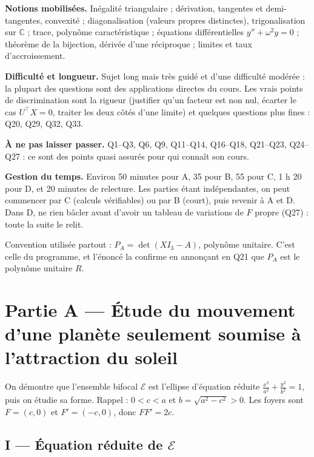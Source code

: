 \documentclass[11pt,a4paper]{article}
\begin{document}
\textbf{Notions mobilisées.} Inégalité triangulaire ; dérivation, tangentes et demi-tangentes, convexité ; diagonalisation (valeurs propres distinctes), trigonalisation sur \(\mathbb{C}\) ; trace, polynôme caractéristique ; équations différentielles \(y''+\omega^2y=0\) ; théorème de la bijection, dérivée d'une réciproque ; limites et taux d'accroissement.

\textbf{Difficulté et longueur.} Sujet long mais très guidé et d'une difficulté modérée : la plupart des questions sont des applications directes du cours. Les vrais points de discrimination sont la rigueur (justifier qu'un facteur est non nul, écarter le cas \(U^\top X=0\), traiter les deux côtés d'une limite) et quelques questions plus fines : Q20, Q29, Q32, Q33.

\textbf{À ne pas laisser passer.} Q1--Q3, Q6, Q9, Q11--Q14, Q16--Q18, Q21--Q23, Q24--Q27 : ce sont des points quasi assurés pour qui connaît son cours.

\textbf{Gestion du temps.} Environ 50 minutes pour A, 35 pour B, 55 pour C, 1 h 20 pour D, et 20 minutes de relecture. Les parties étant indépendantes, on peut commencer par C (calculs vérifiables) ou par B (court), puis revenir à A et D. Dans D, ne rien bâcler avant d'avoir un tableau de variations de \(F\) propre (Q27) : toute la suite le relit.

Convention utilisée partout : \(P_A=\det(XI_3-A)\), polynôme unitaire. C'est celle du programme, et l'énoncé la confirme en annonçant en Q21 que \(P_A\) est le polynôme unitaire \(R\).

\hypertarget{partie-a-uxe9tude-du-mouvement-dune-planuxe8te-seulement-soumise-uxe0-lattraction-du-soleil}{%
\section{Partie A --- Étude du mouvement d'une planète seulement soumise à l'attraction du soleil}\label{partie-a-uxe9tude-du-mouvement-dune-planuxe8te-seulement-soumise-uxe0-lattraction-du-soleil}}

On démontre que l'ensemble bifocal \(\mathcal{E}\) est l'ellipse d'équation réduite \(\frac{x^2}{a^2}+\frac{y^2}{b^2}=1\), puis on étudie sa forme.
Rappel : \(0<c<a\) et \(b=\sqrt{a^2-c^2}>0\). Les foyers sont \(F=(c,0)\) et \(F'=(-c,0)\), donc \(FF'=2c\).

\hypertarget{i-uxe9quation-ruxe9duite-de-mathcale}{%
\subsection{\texorpdfstring{I --- Équation réduite de \(\mathcal{E}\)}{I --- Équation réduite de \textbackslash mathcal\{E\}}}\label{i-uxe9quation-ruxe9duite-de-mathcale}}
\end{document}
